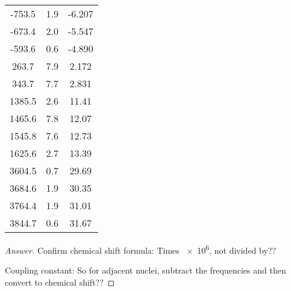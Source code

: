 \documentclass[../psets.tex]{subfiles}
\begin{document}
\begin{enumerate}
\begin{center}
\begin{tabular}{SSS}
            -753.5  & 1.9  & \color{blx}-6.207\\
            -673.4  & 2.0  & \color{blx}-5.547\\
            -593.6  & 0.6  & \color{blx}-4.890\\
            263.7   & 7.9  & \color{blx}2.172\\
            343.7   & 7.7  & \color{blx}2.831\\
            1385.5  & 2.6  & \color{blx}11.41\\
            1465.6  & 7.8  & \color{blx}12.07\\
            1545.8  & 7.6  & \color{blx}12.73\\
            1625.6  & 2.7  & \color{blx}13.39\\
            3604.5  & 0.7  & \color{blx}29.69\\
            3684.6  & 1.9  & \color{blx}30.35\\
            3764.4  & 1.9  & \color{blx}31.01\\
            3844.7  & 0.6  & \color{blx}31.67\\
        \end{tabular}
    \end{center}
    \begin{proof}[Answer]
        Confirm chemical shift formula: Times \num{e6}, not divided by??

        Coupling constant: So for adjacent nuclei, subtract the frequencies and then convert to chemical shift??



\end{proof}
\end{enumerate}
\end{document}
